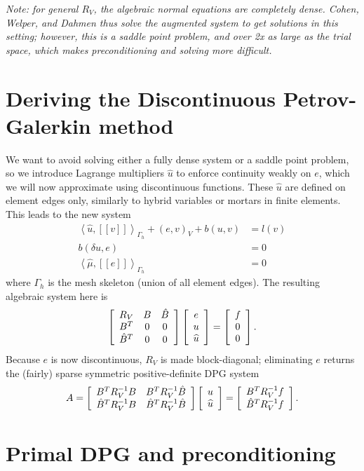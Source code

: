 \documentclass{article}
\newcommand{\LRs}[1]{\left[ #1 \right]}
\newcommand{\LRa}[1]{\left\langle #1 \right\rangle}
\newcommand{\jump}[1] {\ensuremath{\LRs{\![#1]\!}}}
\newcommand{\uh}{\widehat{u}}
\newcommand{\Gh}{\Gamma_h}
\def\vecttwo#1#2{\left[
\begin{array}{c}
#1\\
#2\\
\end{array}
\right]}
\begin{document}
\emph{Note: for general $R_V$, the algebraic normal equations are completely dense.  Cohen, Welper, and Dahmen thus solve the augmented system to get solutions in this setting; however, this is a saddle point problem, and over 2x as large as the trial space, which makes preconditioning and solving more difficult. }

\section{Deriving the Discontinuous Petrov-Galerkin method}
We want to avoid solving either a fully dense system or a saddle point problem, so we introduce Lagrange multipliers $\uh$ to enforce continuity weakly on $e$, which we will now approximate using discontinuous functions.  These $\uh$ are defined on element edges only, similarly to hybrid variables or mortars in finite elements.  This leads to the new system 
\begin{align*}
\LRa{\uh, \jump{v}}_{\Gh} + (e,v)_V + b(u,v) &= l(v) \\
b(\delta u,e) &= 0\\
\LRa{\hat{\mu}, \jump{e}}_{\Gh} &= 0
\end{align*}
where $\Gh$ is the mesh skeleton (union of all element edges).  The resulting algebraic system here is 
\[
\left[
\begin{array}{c c c}
R_V & B& \hat{B}\\
B^T & 0& 0\\
\hat{B}^T & 0& 0
\end{array}
\right]
\left[\begin{array}{c}
e \\ u\\ \uh
\end{array}
\right]
= 
\left[\begin{array}{c}
f\\0\\0
\end{array}
\right].
\]
Because $e$ is now discontinuous, $R_V$ is made block-diagonal; eliminating $e$ returns the (fairly) sparse symmetric positive-definite DPG system
\[
A = \left[\begin{array}{c c}
B^TR_V^{-1}B & B^TR_V^{-1}\hat{B}\\
\hat{B}^TR_V^{-1}B & \hat{B}^TR_V^{-1}\hat{B}
\end{array}\right]
\vecttwo{u}{\uh} = \vecttwo{B^TR_V^{-1} f}{\hat{B}^TR_V^{-1}f}.
\]
\section{Primal DPG and preconditioning}
\end{document}

